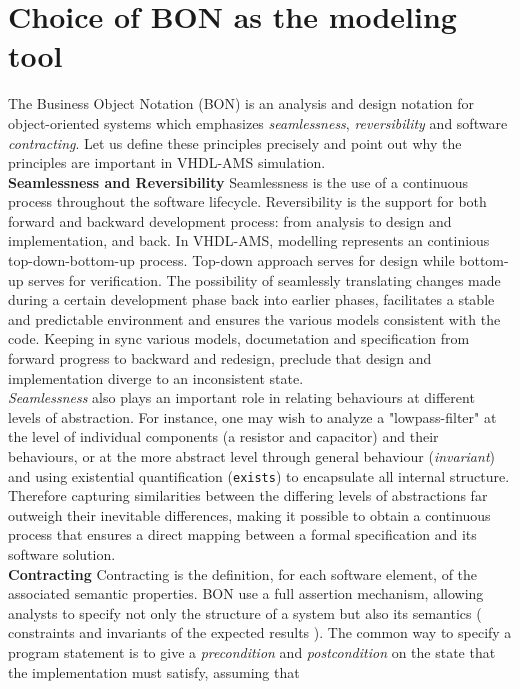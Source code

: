 \documentclass{article}
\newcommand{\inv}{\emph{invariant}\xspace}
\begin{document}
\section{Choice of BON as the modeling tool}
\label{sec:choiceobon}
The Business Object Notation (BON) is an analysis and design notation
for object-oriented systems  which emphasizes \emph{seamlessness},\xspace
\emph{reversibility} and software \emph{contracting}.
Let us define these principles precisely and point out why the principles
are important in VHDL-AMS simulation.\\
\textbf{Seamlessness and  Reversibility} \xspace \xspace
Seamlessness is the use of a continuous process
throughout the software lifecycle. Reversibility is the support for
both forward and backward development process: from analysis to design
and implementation, and back.
In VHDL-AMS, modelling represents an continious top-down-bottom-up
process. Top-down approach serves for design while bottom-up
serves for verification. The possibility of seamlessly translating
changes made during a certain development phase back into earlier phases,
facilitates a stable and predictable environment and ensures the various
models consistent with the code. Keeping in sync various models, documetation
and specification from forward progress to backward and redesign, preclude
that design and implementation diverge to an inconsistent state.\\
\emph{Seamlessness} also plays an important role in relating behaviours at
different levels of abstraction. For instance, one may wish to analyze
a "lowpass-filter" at the level of individual components (a resistor and 
capacitor) and their behaviours, or at the more abstract level through
general behaviour (\inv) and using existential quantification (\texttt{exists})
to encapsulate all internal structure. Therefore capturing similarities between
the differing levels of abstractions far outweigh their inevitable differences,
making it possible to obtain a continuous process that ensures a direct mapping
between a formal specification and its software solution.\\
\textbf{Contracting} \xspace \xspace Contracting is the definition, for each
software element, of the associated semantic properties. BON use a full
assertion mechanism, allowing analysts to specify not only the structure of
a system but also its semantics ( constraints and invariants of the expected results ).
The common way to specify a program statement is to give a \emph{precondition} and
\emph{postcondition} on the state that the implementation must satisfy, assuming that
\end{document}
